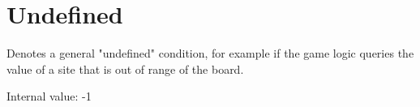 
\section{Undefined}

Denotes a general "undefined" condition, for example if the game logic queries the value of a site that is out of range of the board.

\phantom{}
\noindent
Internal value: -1 


